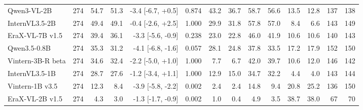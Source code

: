 \begin{table}[t]
\begin{tabular}{lrrrrrrrrrrrrr}
Qwen3-VL-2B & 274 & 54.7 & 51.3 & -3.4 [-6.7, +0.5] & 0.874 & 43.2 & 36.7 & 58.7 & 56.6 & 13.5 & 12.8 & 137 & 138 \\
InternVL3.5-2B & 274 & 49.4 & 49.1 & -0.4 [-2.6, +2.5] & 1.000 & 29.9 & 31.8 & 57.8 & 57.0 & 8.4 & 6.6 & 143 & 149 \\
EraX-VL-7B v1.5 & 274 & 39.4 & 36.1 & -3.3 [-5.6, -0.9] & 0.238 & 23.0 & 22.8 & 46.0 & 41.9 & 10.6 & 10.6 & 140 & 143 \\
Qwen3.5-0.8B & 274 & 35.3 & 31.2 & -4.1 [-6.8, -1.6] & 0.057 & 28.1 & 24.8 & 37.8 & 33.5 & 17.2 & 17.9 & 152 & 150 \\
Vintern-3B-R beta & 274 & 34.6 & 32.4 & -2.2 [-5.0, +1.0] & 1.000 & 7.7 & 6.7 & 42.0 & 39.7 & 10.6 & 12.0 & 146 & 142 \\
InternVL3.5-1B & 274 & 28.7 & 27.6 & -1.2 [-3.4, +1.1] & 1.000 & 12.9 & 15.0 & 34.7 & 32.2 & 4.4 & 4.0 & 143 & 144 \\
Vintern-1B v3.5 & 274 & 12.3 & 8.4 & -3.9 [-5.8, -2.2] & 0.002 & 2.4 & 2.4 & 14.8 & 9.4 & 20.8 & 25.2 & 136 & 150 \\
EraX-VL-2B v1.5 & 274 & 4.3 & 3.0 & -1.3 [-1.7, -0.9] & 0.002 & 1.0 & 0.4 & 4.9 & 3.5 & 38.7 & 38.0 & 67 & 70 \\
\bottomrule
\end{tabular}
\par{}
\end{table}
